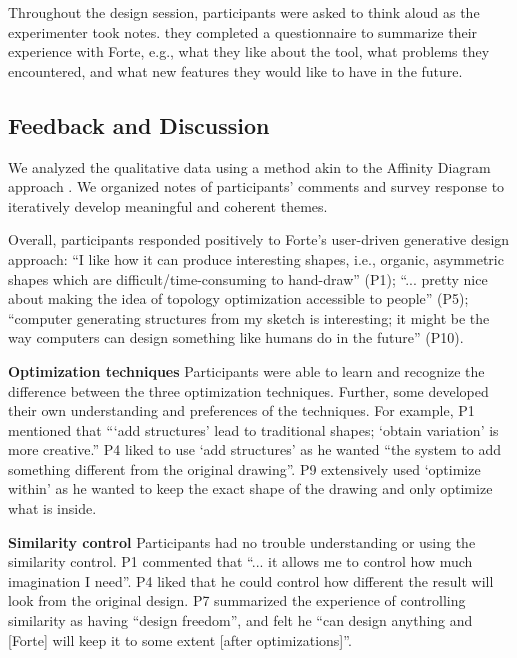 Throughout the design session, participants were asked to think aloud as the experimenter took notes. they completed a questionnaire to summarize their experience with Forte, e.g., what they like about the tool, what problems they encountered, and what new features they would like to have in the future.



\subsection{Feedback and Discussion}
We analyzed the qualitative data using a method akin to the Affinity Diagram approach \cite{beyer1997contextual}. We organized notes of participants' comments and survey response to iteratively develop meaningful and coherent themes. 

Overall, participants responded positively to Forte's user-driven generative design approach: ``I like how it can produce interesting shapes, i.e., organic, asymmetric shapes which are difficult/time-consuming to hand-draw'' (P1); ``... pretty nice about making the idea of topology optimization accessible to people'' (P5); ``computer generating structures from my sketch is interesting; it might be the way computers can design something like humans do in the future'' (P10).

\textbf{Optimization techniques} \hspace{0.1cm} Participants were able to learn and recognize the difference between the three optimization techniques. Further, some developed their own understanding and preferences of the techniques. For example, P1 mentioned that ```add structures' lead to traditional shapes; `obtain variation' is more creative.'' P4 liked to use `add structures' as he wanted ``the system to add something different from the original drawing''. P9 extensively used `optimize within' as he wanted to keep the exact shape of the drawing and only optimize what is inside.

\textbf{Similarity control} \hspace{0.1cm} Participants had no trouble understanding or using the similarity control. P1 commented that ``... it allows me to control how much imagination I need''. P4 liked that he could control how different the result will look from the original design. P7 summarized the experience of controlling similarity as having ``design freedom'', and felt he ``can design anything and [Forte] will keep it to some extent [after optimizations]''.

